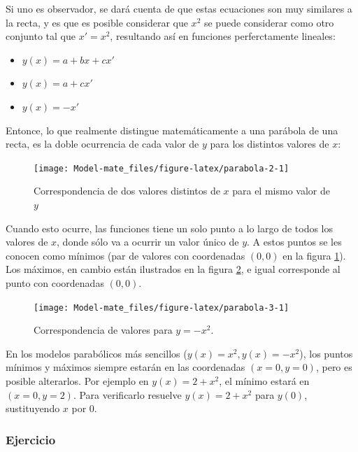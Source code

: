 \documentclass[
]{book}
\providecommand{\tightlist}{%
  \setlength{\itemsep}{0pt}\setlength{\parskip}{0pt}}
\begin{document}
Si uno es observador, se dará cuenta de que estas ecuaciones son muy similares a la recta, y es que es posible considerar que \(x^2\) se puede considerar como otro conjunto tal que \(x' = x^2\), resultando así en funciones perferctamente lineales:

\begin{itemize}
\tightlist
\item
  \(y(x) = a + bx + cx'\)
\item
  \(y(x) = a + cx'\)
\item
  \(y(x) = -x'\)
\end{itemize}

Entonce, lo que realmente distingue matemáticamente a una parábola de una recta, es la doble ocurrencia de cada valor de \(y\) para los distintos valores de \(x\):

\begin{figure}

{\centering \texttt{[image: Model-mate\_files/figure-latex/parabola-2-1]} 

}

\caption{Correspondencia de dos valores distintos de $x$ para el mismo valor de $y$}\label{fig:parabola-2}
\end{figure}

Cuando esto ocurre, las funciones tiene un solo punto a lo largo de todos los valores de \(x\), donde sólo va a ocurrir un valor único de \(y\). A estos puntos se les conocen como mínimos (par de valores con coordenadas \((0, 0)\) en la figura \ref{fig:parabola-2}). Los máximos, en cambio están ilustrados en la figura \ref{fig:parabola-3}, e igual corresponde al punto con coordenadas \((0, 0)\).

\begin{figure}

{\centering \texttt{[image: Model-mate\_files/figure-latex/parabola-3-1]} 

}

\caption{Correspondencia de valores para $y = -x^2$.}\label{fig:parabola-3}
\end{figure}

En los modelos parabólicos más sencillos (\(y(x) = x^2, y(x) = -x^2\)), los puntos mínimos y máximos siempre estarán en las coordenadas \((x = 0, y = 0)\), pero es posible alterarlos. Por ejemplo en \(y(x) = 2 + x^2\), el mínimo estará en \((x = 0, y = 2)\). Para verificarlo resuelve \(y(x) = 2 + x^2\) para \(y(0)\), sustituyendo \(x\) por \(0\).

\hypertarget{ejercicio}{%
\subsubsection{Ejercicio}\label{ejercicio}}
\end{document}
